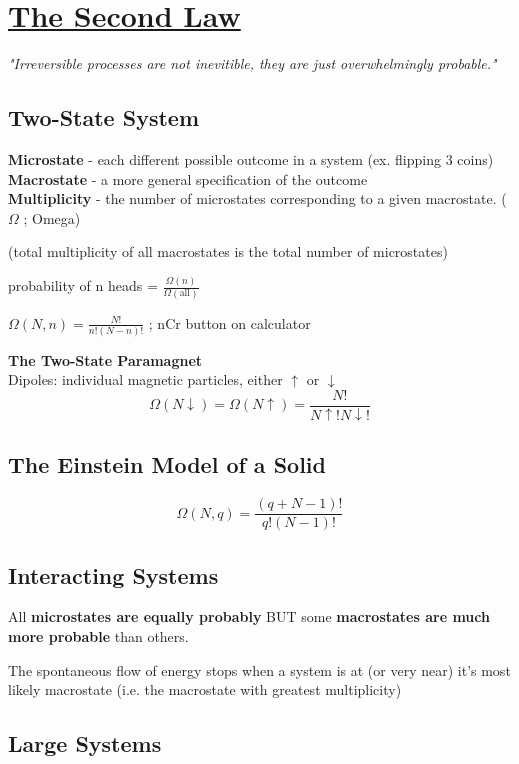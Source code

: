 \def \secname {The Second Law}

\section[\secname]{\hyperlink{toc}{\secname}}


\textit{"Irreversible processes are not inevitible, they are just overwhelmingly probable."}

\subsection{Two-State System}
\textbf{Microstate} - each different possible outcome in a system (ex. flipping 3 coins)\\
\textbf{Macrostate} - a more general specification of the outcome\\
\textbf{Multiplicity} - the number of microstates corresponding to a given macrostate. ($\Omega$ ; Omega)

(total multiplicity of all macrostates is the total number of microstates)

probability of n heads = $\frac{\Omega (n)}{\Omega (\text{all})}$

$\Omega (N,n) = \frac{N!}{n!(N-n)!}$ ; nCr button on calculator

\textbf{The Two-State Paramagnet}\\
Dipoles: individual magnetic particles, either $\uparrow$ or $\downarrow$
\[ \Omega (N\downarrow) = \Omega (N\uparrow) = \frac{N!}{N\uparrow!N\downarrow!} \]

\subsection{The Einstein Model of a Solid}
\[ \Omega (N,q) = \frac{(q+N-1)!}{q!(N-1)!}\]

\subsection{Interacting Systems}

 All \textbf{microstates are equally probably} BUT some \textbf{macrostates are much more probable} than others.
 
 The spontaneous flow of energy stops when a system is at (or very near) it's most likely macrostate (i.e. the macrostate with greatest multiplicity)
 
 \subsection{Large Systems}
 
